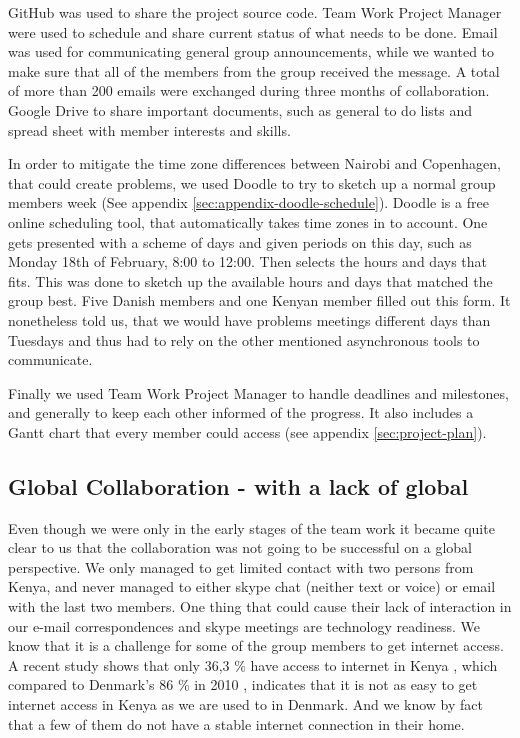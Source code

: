 GitHub was used to share the project source code. 
Team Work Project Manager were used to schedule and share current status of what needs to be done.
Email was used for communicating general group announcements, while we wanted to make sure that all of the members from the group received the message. A total of more than 200 emails were exchanged during three months of collaboration. 
Google Drive to share important documents, such as general to do lists and spread sheet with member interests and skills. 

In order to mitigate the time zone differences between Nairobi and Copenhagen, that could create problems, we used Doodle to try to sketch up a normal group members week (See appendix \ref{sec:appendix-doodle-schedule}). Doodle is a free online scheduling tool, that automatically takes time zones in to account. One gets presented with a scheme of days and given periods on this day, such as Monday 18th of February, 8:00 to 12:00. Then selects the hours and days that fits. This was done to sketch up the available hours and days that matched the group best. Five Danish members and one Kenyan member filled out this form. It nonetheless told us, that we would have problems meetings different days than Tuesdays and thus had to rely on the other mentioned asynchronous tools to communicate. 

Finally we used Team Work Project Manager to handle deadlines and milestones, and generally to keep each other informed of the progress. It also includes a Gantt chart that every member could access (see appendix \ref{sec:project-plan}).

\subsection{Global Collaboration - with a lack of global} \label{sec:teamworkgonewrong}
Even though we were only in the early stages of the team work it became quite clear to us that the collaboration was not going to be successful on a global perspective. We only managed to get limited contact with two persons from Kenya, and never managed to either skype chat (neither text or voice) or email with the last two members. One thing that could cause their lack of interaction in our e-mail correspondences and skype meetings are technology readiness. We know that it is a challenge for some of the group members to get internet access. A recent study shows that only 36,3 \% have access to internet in Kenya \cite{capitalfm2012internet}, which compared to Denmark's 86 \% in 2010 \cite{folketingets-eu-oplysning}, indicates that it is not as easy to get internet access in Kenya as we are used to in Denmark. And we know by fact that a few of them do not have a stable internet connection in their home. 

